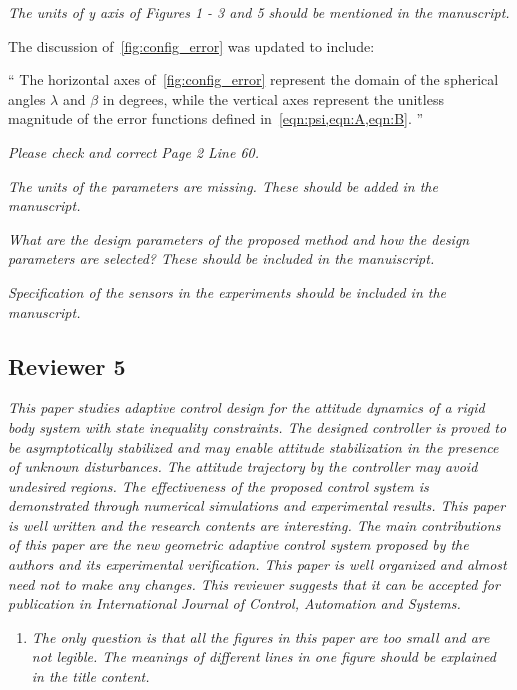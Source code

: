 \documentclass[11pt]{article}
\newenvironment{correction}{\begin{list}{}{\setlength{\leftmargin}{1cm}\setlength{\rightmargin}{1cm}}\vspace{\parsep}\item[]``}{''\end{list}}
\begin{document}
\begin{enumerate}
\item \textit{The units of y axis of Figures 1 - 3 and 5 should be mentioned in the manuscript.}

The discussion of~\cref{fig:config_error} was updated to include:
\begin{correction}
    The horizontal axes of~\cref{fig:config_error} represent the domain of the spherical angles \( \lambda \) and \( \beta \) in degrees, while the vertical axes represent the unitless magnitude of the error functions defined in~\cref{eqn:psi,eqn:A,eqn:B}.    
\end{correction}
\item \textit{Please check and correct Page 2 Line 60.}
\item \textit{The units of the parameters are missing. These should be added in the manuscript.}
\item \textit{What are the design parameters of the proposed method and how the design parameters are selected? These should be included in the manuiscript.}
\item \textit{Specification of the sensors in the experiments should be included in the manuscript.}
\end{enumerate}

\subsection*{Reviewer 5}
\textit{This paper studies adaptive control design for the attitude dynamics of a rigid body system with state inequality constraints. The designed controller is proved to be asymptotically stabilized and may enable attitude stabilization in the presence of unknown disturbances. The attitude trajectory by the controller may avoid undesired regions. The effectiveness of the proposed control system is demonstrated through numerical simulations and experimental results. This paper is well written and the research contents are interesting. The main contributions of this paper are the new geometric adaptive control system proposed by the authors and its experimental verification. This paper is well organized and almost need not to make any changes. This reviewer suggests that it can be accepted for publication in International Journal of Control, Automation and Systems.}

\begin{enumerate}
\item \textit{The only question is that all the figures in this paper are too small and are not legible. The meanings of different lines in one figure should be explained in the title content.}
\end{enumerate}



\end{document}
